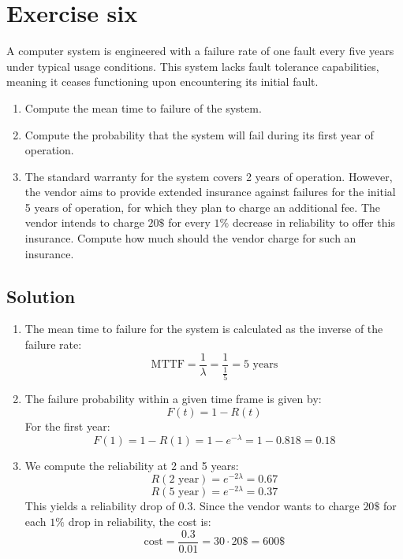 \section{Exercise six}

A computer system is engineered with a failure rate of one fault every five years under typical usage conditions. 
This system lacks fault tolerance capabilities, meaning it ceases functioning upon encountering its initial fault.
\begin{enumerate}
    \item Compute the mean time to failure of the system.
    \item Compute the probability that the system will fail during its first year of operation. 
    \item The standard warranty for the system covers 2 years of operation. 
        However, the vendor aims to provide extended insurance against failures for the initial 5 years of operation, for which they plan to charge an additional fee.  
        The vendor intends to charge $20\$$ for every $1\%$ decrease in reliability to offer this insurance. 
        Compute how much should the vendor charge for such an insurance.
\end{enumerate}

\subsection*{Solution}
\begin{enumerate}
    \item The mean time to failure for the system is calculated as the inverse of the failure rate:
        \[\text{MTTF}=\dfrac{1}{\lambda}=\dfrac{1}{\frac{1}{5}}=5\text{ years}\]
    \item The failure probability within a given time frame is given by:
        \[F(t)=1-R(t)\]
        For the first year:
        \[F(1)=1-R(1)=1-e^{-\lambda}=1-0.818=0.18\]
    \item We compute the reliability at 2 and 5 years:
        \[R(2\text{ year})=e^{-2\lambda}=0.67\]
        \[R(5\text{ year})=e^{-2\lambda}=0.37\]
        This yields a reliability drop of $0.3$. 
        Since the vendor wants to charge $20\$$ for each $1\%$ drop in reliability, the cost is:
        \[\text{cost}=\dfrac{0.3}{0.01}=30\cdot 20\$=600\$\]
\end{enumerate}
